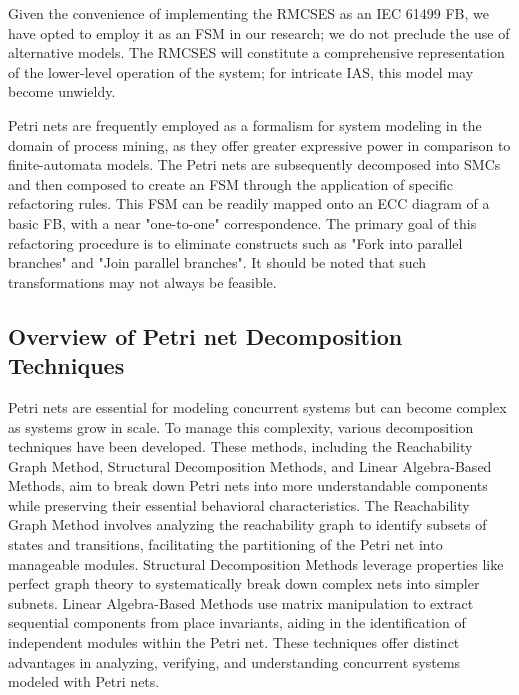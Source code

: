 \begin{bibunit}
Given the convenience of implementing the RMCSES as an IEC 61499 FB, we have opted to employ it as an FSM in our research; we do not preclude the use of alternative models. The RMCSES will constitute a comprehensive representation of the lower-level operation of the system; for intricate IAS, this model may become unwieldy.




Petri nets  \cite{van2013discovering} are frequently employed as a formalism for system modeling in the domain of process mining, as they offer greater expressive power in comparison to finite-automata models. The Petri nets are subsequently decomposed into SMCs and then composed to create an FSM through the application of specific refactoring rules. This FSM can be readily mapped onto an ECC diagram of a basic FB, with a near "one-to-one" correspondence. The primary goal of this refactoring procedure is to eliminate constructs such as "Fork into parallel branches" and "Join parallel branches". It should be noted that such transformations may not always be feasible.



\subsection{Overview of Petri net Decomposition Techniques}
\label{Petri net Decomposition}

Petri nets are essential for modeling concurrent systems \cite{liu2022petri} but can become complex as systems grow in scale. To manage this complexity, various decomposition techniques have been developed. These methods, including the Reachability Graph Method, Structural Decomposition Methods, and Linear Algebra-Based Methods, aim to break down Petri nets into more understandable components while preserving their essential behavioral characteristics. The Reachability Graph Method \cite{buchholz2002hierarchical} involves analyzing the reachability graph to identify subsets of states and transitions, facilitating the partitioning of the Petri net into manageable modules. Structural Decomposition Methods \cite{ye2017structural, hsieh2011robustness} leverage properties like perfect graph theory to systematically break down complex nets into simpler subnets. Linear Algebra-Based Methods \cite{wisniewski2019decomposition, best2013petri} use matrix manipulation to extract sequential components from place invariants, aiding in the identification of independent modules within the Petri net. These techniques offer distinct advantages in analyzing, verifying, and understanding concurrent systems modeled with Petri nets.



\end{bibunit}

